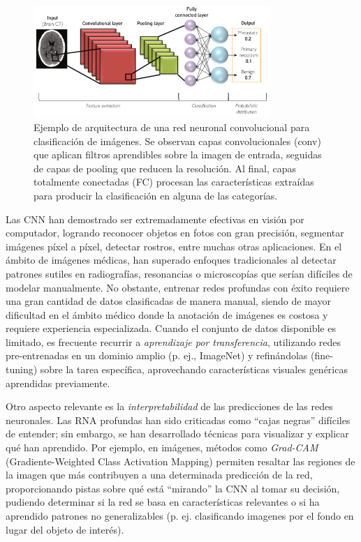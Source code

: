 \documentclass[11pt,spanish,listoffigures,listoftables]{tfgetsinf}
\begin{document}
\begin{figure}[ht] \centering \includegraphics[width=0.8\textwidth]{cnn.png} 
    \caption{Ejemplo de arquitectura de una red neuronal convolucional para clasificación de imágenes. Se observan capas convolucionales (conv) que aplican 
    filtros aprendibles sobre la imagen de entrada, seguidas de capas de pooling que reducen la resolución. Al final, capas totalmente conectadas (FC) procesan 
    las características extraídas para producir la clasificación en alguna de las categorías.} 
    \label{fig:cnn_arch} 
\end{figure}

Las CNN han demostrado ser extremadamente efectivas en visión por computador, logrando reconocer objetos en fotos con gran precisión, segmentar imágenes píxel a píxel, 
detectar rostros, entre muchas otras aplicaciones. En el ámbito de imágenes médicas, han superado enfoques tradicionales al detectar patrones sutiles en radiografías, 
resonancias o microscopías que serían difíciles de modelar manualmente. No obstante, entrenar redes profundas con éxito requiere una gran cantidad de datos
clasificadas de manera manual, siendo de mayor dificultad en el ámbito médico donde la anotación de imágenes es costosa y requiere experiencia especializada.
Cuando el conjunto de datos disponible es limitado, es frecuente recurrir a \textit{aprendizaje por transferencia}, utilizando redes pre-entrenadas en un dominio 
amplio (p. ej., ImageNet) y refinándolas (fine-tuning) sobre la tarea específica, aprovechando características visuales genéricas aprendidas previamente.

Otro aspecto relevante es la \textit{interpretabilidad} de las predicciones de las redes neuronales. Las RNA profundas han sido criticadas como “cajas negras” 
difíciles de entender; sin embargo, se han desarrollado técnicas para visualizar y explicar qué han aprendido. Por ejemplo, en imágenes, métodos como \textit{Grad-CAM} 
(Gradiente-Weighted Class Activation Mapping) permiten resaltar las regiones de la imagen que más contribuyen a una determinada predicción de la red, proporcionando 
pistas sobre qué está “mirando” la CNN al tomar su decisión, pudiendo determinar si la red se basa en características relevantes o si ha aprendido patrones no generalizables
(p. ej. clasificando imagenes por el fondo en lugar del objeto de interés). 
\end{document}
